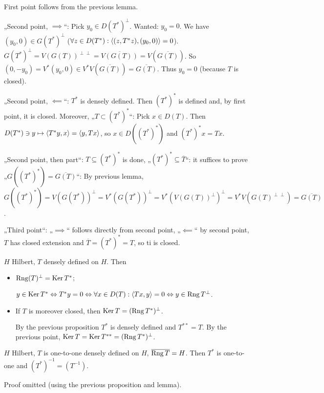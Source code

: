 \documentclass[12pt]{article}					%
\begin{document}
\begin{dukaz}
	First point follows from the previous lemma.

	„Second point, $\implies$“: Pick $y_0 \in D(T^*)^\perp$. Wanted: $y_0 = 0$. We have $(y_0, 0) \in G(T^*)^\perp$ ($\forall z \in D(T^*): \left\langle(z, T^*z), (y_0, 0)\right\rangle = 0$). $G(T^*)^\perp = V(G(T))^{\perp\perp} = \overline{V(G(T))} = V(\overline{G(T)})$. So $(0, -y_0) = V^*(y_0, 0) \in V^* V(\overline{G(T)}) = \overline{G(T)}$. Thus $y_0 = 0$ (because $T$ is closed).

	„Second point, $\impliedby$“: $T^*$ is densely defined. Then $(T^*)^*$ is defined and, by first point, it is closed. Moreover, „$T \subset (T^*)^*$“: Pick $x \in D(T)$. Then $D(T^*) \ni y \mapsto \left\langle T^* y, x\right\rangle = \left\langle y, Tx\right\rangle$, so $x \in D((T^*)^*)$ and $(T^*)^* x = Tx$.

	„Second point, then part“: $T \subseteq (T^*)^*$ is done, „$(T^*)^* \subseteq \overline{T}$“: it suffices to prove „$G((T^*)^*) = \overline{G(T)}$“: By previous lemma, $G((T^*)^*) = V(G(T^*))^\perp = V^*(G(T^*))^\perp = V^*(V(G(T))^\perp)^\perp = V^*V(G(T)^{\perp\perp}) = \overline{G(T)}$.

	„Third point“: „$\implies$“ follows directly from second point, „$\impliedby$“ by second point, $T$ has closed extension and $\overline{T} = (T^*)^* = T$, so ti is closed.
\end{dukaz}

\begin{tvrzeni}
	$H$ Hilbert, $T$ densely defined on $H$. Then

	\begin{itemize}
		\item $\operatorname{Rng}(T)^\perp = \operatorname{Ker} T^*$;
			\begin{dukazin}
				$y \in \operatorname{Ker} T^* \Leftrightarrow T^*y = 0 \Leftrightarrow \forall x \in D(T): \left\langle Tx, y\right\rangle = 0 \Leftrightarrow y \in \operatorname{Rng} T^\perp$.
			\end{dukazin}
		\item If $T$ is moreover closed, then $\operatorname{Ker} T = (\operatorname{Rng} T^*)^\perp$.
			\begin{dukazin}
				By the previous proposition $T^*$ is densely defined and $T^{**} = T$. By the previous point, $\operatorname{Ker} T = \operatorname{Ker} T^{**} = (\operatorname{Rng} T^*)^\perp$.
			\end{dukazin}
	\end{itemize}
\end{tvrzeni}

\begin{tvrzeni}
	$H$ Hilbert, $T$ is one-to-one densely defined on $H$, $\overline{\operatorname{Rng} T} = H$. Then $T^*$ is one-to-one and $(T^*)^{-1} = (T^{-1})$.

	\begin{dukazin}
		Proof omitted (using the previous proposition and lemma).
	\end{dukazin}
\end{tvrzeni}
\end{document}
